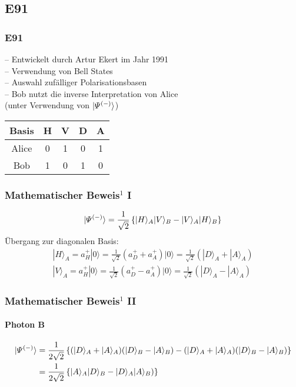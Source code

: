 \subsection{E91}
\begin{frame}
	\frametitle{E91}
	-- Entwickelt durch Artur Ekert im Jahr 1991\\
	-- Verwendung von Bell States \\
	-- Auswahl zufälliger Polarisationsbasen\\
	-- Bob nutzt die inverse Interpretation von Alice \\
		\hspace{0.5em} (unter Verwendung von $|\mathnormal{\Psi}^{(-)}\rangle$) \\
	\vspace{1em}
	\hspace{0.5em}
	\begin{tabular}{c|c|c|c|c}
		Basis & H & V & D & A \\
		\hline
		Alice & 0 & 1 & 0 & 1 \\
		\hline
		Bob & 1 & 0 & 1 & 0 \\
	\end{tabular}
\end{frame}

\begin{frame}
	\frametitle{Mathematischer Beweis$^{1}$ I}
	\begin{align}
		|\mathnormal{\Psi}^{(-)}\rangle = \frac{1}{\sqrt{2}} \left\{|H\rangle_{A}|V\rangle_{B} - |V\rangle_{A}|H\rangle_{B}\right\}
	\end{align}
	Übergang zur diagonalen Basis:
	\begin{align*}
		|H\rangle_A = a_H^+|0\rangle = \frac{1}{\sqrt{2}}(a_D^++a_A^+)|0\rangle = \frac{1}{\sqrt{2}}(|D\rangle_A+|A\rangle_A) \\
		|V\rangle_A = a_H^+|0\rangle = \frac{1}{\sqrt{2}}(a_D^+-a_A^+)|0\rangle = \frac{1}{\sqrt{2}}(|D\rangle_A-|A\rangle_A)
	\end{align*}
\end{frame}

\begin{frame}
	\frametitle{Mathematischer Beweis$^{1}$ II}
	\framesubtitle{Photon B}
	\begin{alignat*}{2}
		|\mathnormal{\Psi}^{(-)}\rangle & = \frac{1}{2\sqrt{2}}\left\{(|D\rangle_A+|A\rangle_A)(|D\rangle_B-|A\rangle_B) - (|D\rangle_A+|A\rangle_A)(|D\rangle_B-|A\rangle_B)\right\}\\
		& = \frac{1}{2\sqrt{2}}\left\{|A\rangle_A|D\rangle_B - |D\rangle_A|A\rangle_B)\right\}
	\end{alignat*}
	
\end{frame}

